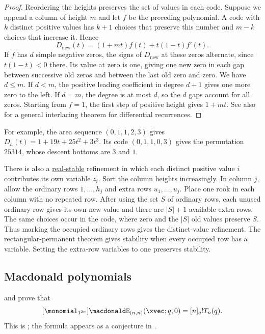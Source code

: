 \begin{proof}
Reordering the heights preserves the set of values in each code.
Suppose we append a column of height $m$ and let $f$ be the preceding
polynomial. A code with $k$ distinct positive values has $k+1$ choices
that preserve this number and $m-k$ choices that increase it. Hence
\[
 D_{\mathrm{new}}(t)=(1+mt)f(t)+t(1-t)f'(t).
\]
If $f$ has $d$ simple negative zeros, the signs of $D_{\mathrm{new}}$
at these zeros alternate, since $t(1-t)<0$ there. Its value at zero
is one, giving one new zero in each gap between successive old zeros
and between the last old zero and zero. We have $d\leq m$. If $d<m$,
the positive leading coefficient in degree $d+1$ gives one more zero
to the left. If $d=m$, the degree is at most $d$, so the $d$ gaps
account for all zeros. Starting from $f=1$, the first step of positive
height gives $1+mt$. See also \cite{MaWang2008} for a general
interlacing theorem for differential recurrences.
\end{proof}

For example, the area sequence $(0,1,1,2,3)$ gives
$D_h(t)=1+19t+25t^2+3t^3$. Its code $(0,1,1,0,3)$ gives the
permutation $25314$, whose descent bottoms are $3$ and $1$.

There is also a \hyperref[stablePolynomial]{real-stable} refinement
in which each distinct positive value $i$ contributes its own variable
$z_i$. Sort the column heights increasingly. In column $j$, allow the
ordinary rows $1,\ldots,h_j$ and extra rows $u_1,\ldots,u_j$. Place one
rook in each column with no repeated row. After using the set $S$ of
ordinary rows, each unused ordinary row gives its own new value and
there are $|S|+1$ available extra rows. The same choices occur in the
code, where zero and the $|S|$ old values preserve $S$. Thus marking
the occupied ordinary rows gives the distinct-value refinement.
The rectangular-permanent theorem \cite[Thm.~10.2]{ChoeOxleySokalWagner2004}
gives stability when every occupied row has a variable. Setting the
extra-row variables to one preserves stability.


\subsection[aoMacdonald]{Macdonald polynomials}

 and  prove that
\[
[\monomial_{1^{2n}}] \macdonaldE_{(n,n)}(\xvec;q,0) = [n]_q! T_n(q).
\]
This is \cite[Prop.~5.9]{AlexanderssonUhlin2020}; the formula appears as a
conjecture in \cite{Uhlin2019}.

